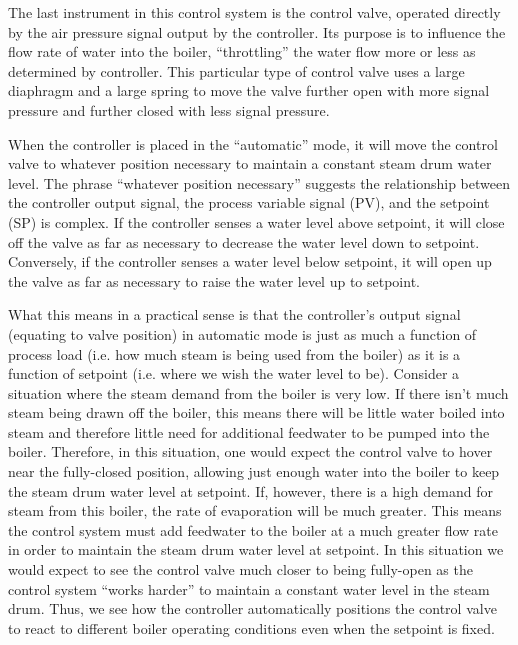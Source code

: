 The last instrument in this control system is the control valve, operated directly by the air pressure signal output by the controller.  Its purpose is to influence the flow rate of water into the boiler, ``throttling'' the water flow more or less as determined by controller.  This particular type of control valve uses a large diaphragm and a large spring to move the valve further open with more signal pressure and further closed with less signal pressure.

\vskip 10pt

When the controller is placed in the ``automatic'' mode, it will move the control valve to whatever position necessary to maintain a constant steam drum water level.  The phrase ``whatever position necessary'' suggests the relationship between the controller output signal, the process variable signal (PV), and the setpoint (SP) is complex.  If the controller senses a water level above setpoint, it will close off the valve as far as necessary to decrease the water level down to setpoint.  Conversely, if the controller senses a water level below setpoint, it will open up the valve as far as necessary to raise the water level up to setpoint.  

What this means in a practical sense is that the controller's output signal (equating to valve position) in automatic mode is just as much a function of process load (i.e. how much steam is being used from the boiler) as it is a function of setpoint (i.e. where we wish the water level to be).  Consider a situation where the steam demand from the boiler is very low.  If there isn't much steam being drawn off the boiler, this means there will be little water boiled into steam and therefore little need for additional feedwater to be pumped into the boiler.  Therefore, in this situation, one would expect the control valve to hover near the fully-closed position, allowing just enough water into the boiler to keep the steam drum water level at setpoint.  If, however, there is a high demand for steam from this boiler, the rate of evaporation will be much greater.  This means the control system must add feedwater to the boiler at a much greater flow rate in order to maintain the steam drum water level at setpoint.  In this situation we would expect to see the control valve much closer to being fully-open as the control system ``works harder'' to maintain a constant water level in the steam drum.  Thus, we see how the controller automatically positions the control valve to react to different boiler operating conditions even when the setpoint is fixed.

